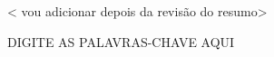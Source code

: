 \abstract
< vou adicionar depois da revisão do resumo>
\begin{keywords}
DIGITE AS PALAVRAS-CHAVE AQUI
\end{keywords}
